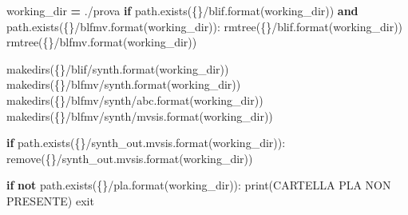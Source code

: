 \documentclass[
]{book}
\newenvironment{Shaded}{\begin{snugshade}}{\end{snugshade}}
\newcommand{\BuiltInTok}[1]{#1}
\newcommand{\ControlFlowTok}[1]{\textcolor[rgb]{0.13,0.29,0.53}{\textbf{#1}}}
\newcommand{\KeywordTok}[1]{\textcolor[rgb]{0.13,0.29,0.53}{\textbf{#1}}}
\newcommand{\NormalTok}[1]{#1}
\newcommand{\OperatorTok}[1]{\textcolor[rgb]{0.81,0.36,0.00}{\textbf{#1}}}
\newcommand{\SpecialCharTok}[1]{\textcolor[rgb]{0.00,0.00,0.00}{#1}}
\newcommand{\StringTok}[1]{\textcolor[rgb]{0.31,0.60,0.02}{#1}}
\begin{document}
\begin{Shaded}
\begin{Highlighting}[]
\NormalTok{working\_dir }\OperatorTok{=} \StringTok{\textquotesingle{}./prova\textquotesingle{}}
 \ControlFlowTok{if}\NormalTok{ path.exists(}\StringTok{\textquotesingle{}}\SpecialCharTok{\{\}}\StringTok{/blif\textquotesingle{}}\NormalTok{.}\BuiltInTok{format}\NormalTok{(working\_dir)) }
    \KeywordTok{and}\NormalTok{ path.exists(}\StringTok{\textquotesingle{}}\SpecialCharTok{\{\}}\StringTok{/blfmv\textquotesingle{}}\NormalTok{.}\BuiltInTok{format}\NormalTok{(working\_dir)):}
\NormalTok{        rmtree(}\StringTok{\textquotesingle{}}\SpecialCharTok{\{\}}\StringTok{/blif\textquotesingle{}}\NormalTok{.}\BuiltInTok{format}\NormalTok{(working\_dir))}
\NormalTok{        rmtree(}\StringTok{\textquotesingle{}}\SpecialCharTok{\{\}}\StringTok{/blfmv\textquotesingle{}}\NormalTok{.}\BuiltInTok{format}\NormalTok{(working\_dir))}
      
\NormalTok{makedirs(}\StringTok{\textquotesingle{}}\SpecialCharTok{\{\}}\StringTok{/blif/synth\textquotesingle{}}\NormalTok{.}\BuiltInTok{format}\NormalTok{(working\_dir))}
\NormalTok{makedirs(}\StringTok{\textquotesingle{}}\SpecialCharTok{\{\}}\StringTok{/blfmv/synth\textquotesingle{}}\NormalTok{.}\BuiltInTok{format}\NormalTok{(working\_dir))}
\NormalTok{makedirs(}\StringTok{\textquotesingle{}}\SpecialCharTok{\{\}}\StringTok{/blfmv/synth/abc\textquotesingle{}}\NormalTok{.}\BuiltInTok{format}\NormalTok{(working\_dir))}
\NormalTok{makedirs(}\StringTok{\textquotesingle{}}\SpecialCharTok{\{\}}\StringTok{/blfmv/synth/mvsis\textquotesingle{}}\NormalTok{.}\BuiltInTok{format}\NormalTok{(working\_dir))}

\ControlFlowTok{if}\NormalTok{ path.exists(}\StringTok{\textquotesingle{}}\SpecialCharTok{\{\}}\StringTok{/synth\_out.mvsis\textquotesingle{}}\NormalTok{.}\BuiltInTok{format}\NormalTok{(working\_dir)):}
\NormalTok{    remove(}\StringTok{\textquotesingle{}}\SpecialCharTok{\{\}}\StringTok{/synth\_out.mvsis\textquotesingle{}}\NormalTok{.}\BuiltInTok{format}\NormalTok{(working\_dir))}

\ControlFlowTok{if} \KeywordTok{not}\NormalTok{ path.exists(}\StringTok{\textquotesingle{}}\SpecialCharTok{\{\}}\StringTok{/pla\textquotesingle{}}\NormalTok{.}\BuiltInTok{format}\NormalTok{(working\_dir)):}
    \BuiltInTok{print}\NormalTok{(}\StringTok{\textquotesingle{}CARTELLA PLA NON PRESENTE\textquotesingle{}}\NormalTok{)}
\NormalTok{    exit}
\end{Highlighting}
\end{Shaded}
\end{document}
